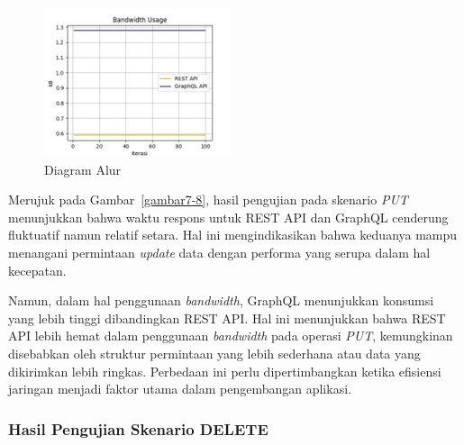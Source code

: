 \documentclass[
 manuscript=article,  %
  layout=publish, 
  year=2024, 
  month= Februari, %
  volume=8,
  number=1 
]{JIKO}
\begin{document}
\begin{minipage}{0.48\textwidth}
    \begin{figure}[H]
        \centering
        \includegraphics[width=\textwidth]{assets/Picture8.jpg}
        \caption{Diagram Alur}
        \label{fig:diagram}
    \end{figure}
\end{minipage}

Merujuk pada Gambar~\ref{gambar7-8}, hasil pengujian pada skenario \textit{PUT} menunjukkan bahwa waktu respons untuk REST API dan GraphQL cenderung fluktuatif namun relatif setara. Hal ini mengindikasikan bahwa keduanya mampu menangani permintaan \textit{update} data dengan performa yang serupa dalam hal kecepatan.

Namun, dalam hal penggunaan \textit{bandwidth}, GraphQL menunjukkan konsumsi yang lebih tinggi dibandingkan REST API. Hal ini menunjukkan bahwa REST API lebih hemat dalam penggunaan \textit{bandwidth} pada operasi \textit{PUT}, kemungkinan disebabkan oleh struktur permintaan yang lebih sederhana atau data yang dikirimkan lebih ringkas. Perbedaan ini perlu dipertimbangkan ketika efisiensi jaringan menjadi faktor utama dalam pengembangan aplikasi.


\subsubsection{Hasil Pengujian Skenario DELETE}
\end{document}
